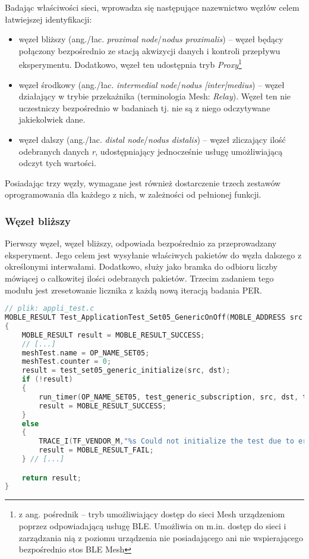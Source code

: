 Badając właściwości sieci, wprowadza się następujące nazewnictwo węzłów celem łatwiejszej identyfikacji:
\begin{itemize}\label{node-naming-convention}
	\item węzeł bliższy (ang./łac. \textit{proximal node}/\textit{nodus proximalis}) -- węzeł będący połączony bezpośrednio
	ze stacją akwizycji danych i kontroli przepływu eksperymentu. Dodatkowo, węzeł ten udostępnia tryb \textit{Proxy}\footnote{z ang. pośrednik -- tryb umożliwiający dostęp do sieci Mesh urządzeniom poprzez odpowiadającą usługę BLE. Umożliwia
	on m.in. dostęp do sieci i zarządzania nią z poziomu urządzenia nie posiadającego ani nie wspierającego bezpośrednio stos BLE Mesh}
	\item węzeł środkowy (ang./łac. \textit{intermedial node}/\textit{nodus [inter]medius}) -- węzeł działający w trybie
	przekaźnika (terminologia Mesh: \textit{Relay}). Węzeł ten nie uczestniczy bezpośrednio w badaniach tj. nie są
	z niego odczytywane jakiekolwiek dane.
	\item węzeł dalszy (ang./łac. \textit{distal node}/\textit{nodus distalis}) -- węzeł zliczający ilość odebranych danych \textit{r},
	udostępniający jednocześnie usługę umożliwiającą odczyt tych wartości. 
\end{itemize}

Posiadając trzy węzły, wymagane jest również dostarczenie trzech zestawów oprogramowania dla każdego z nich, w zależności
od pełnionej funkcji.

\subsubsection{Węzeł bliższy}
Pierwszy węzeł, węzeł bliższy, odpowiada bezpośrednio za przeprowadzany eksperyment. Jego celem jest wysyłanie właściwych
pakietów do węzła dalszego z określonymi interwałami. Dodatkowo, służy jako bramka do odbioru liczby mówiącej
o całkowitej ilości odebranych pakietów. Trzecim zadaniem tego modułu jest zresetowanie licznika z każdą nową iteracją
badania PER.

\begin{lstlisting}[language=C,
    caption={Kod uruchamiający sekwencję badawczą PER},
    label={lst:code_generic_onoff}]
// plik: appli_test.c
MOBLE_RESULT Test_ApplicationTest_Set05_GenericOnOff(MOBLE_ADDRESS src ,MOBLE_ADDRESS dst)
{
	MOBLE_RESULT result = MOBLE_RESULT_SUCCESS;
	// [...]
	meshTest.name = OP_NAME_SET05;
	meshTest.counter = 0;
	result = test_set05_generic_initialize(src, dst);
	if (!result)
	{
		run_timer(OP_NAME_SET05, test_generic_subscription, src, dst, test_set05_generic);
		result = MOBLE_RESULT_SUCCESS;
	}
	else
	{
		TRACE_I(TF_VENDOR_M,"%s Could not initialize the test due to error code=%d \r\n", OP_NAME_SET05, result);
		result = MOBLE_RESULT_FAIL;
	} // [...]

	return result;
}
\end{lstlisting}

